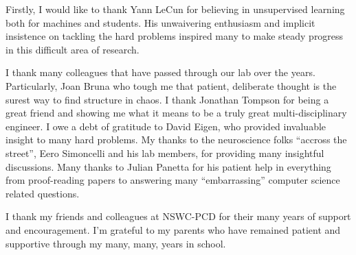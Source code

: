 Firstly, I would like to thank Yann LeCun for believing in unsupervised
learning both for machines and students. His unwaivering enthusiasm and
implicit insistence on tackling the hard problems inspired many to make steady
progress in this difficult area of research.

I thank many colleagues that have passed through our lab over the years.
Particularly, Joan Bruna who tough me that patient, deliberate thought is the
surest way to find structure in chaos.  I thank Jonathan Tompson for being a
great friend and showing me what it means to be a truly great
multi-disciplinary engineer.  I owe a debt of gratitude to David Eigen, who
provided invaluable insight to many hard problems. My thanks to the
neuroscience folks ``accross the street'', Eero Simoncelli and his lab members,
for providing many insightful discussions. Many thanks to Julian Panetta for
his patient help in everything from proof-reading papers to answering many
``embarrassing'' computer science related questions. 
      
I thank my friends and colleagues at NSWC-PCD for their many years of support
and encouragement. I'm grateful to my parents who have remained patient and
supportive through my many, many, years in school. 


 
